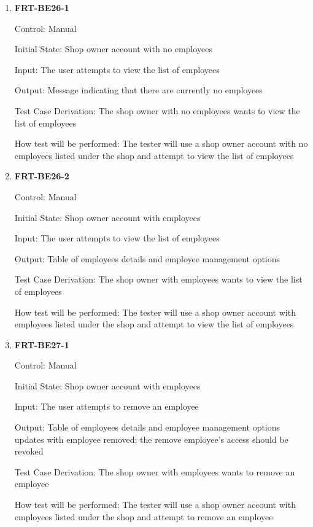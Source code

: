 \documentclass[12pt, titlepage]{article}
\begin{document}
\begin{enumerate}
	\item \textbf{FRT-BE26-1}

	      Control: Manual

	      Initial State: Shop owner account with no employees

	      Input: The user attempts to view the list of employees

	      Output: Message indicating that there are currently no employees

	      Test Case Derivation: The shop owner with no employees wants to view the list of employees

	      How test will be performed: The tester will use a shop owner account with no employees listed under
	      the shop and attempt to view the list of employees

	\item \textbf{FRT-BE26-2}

	      Control: Manual

	      Initial State: Shop owner account with employees

	      Input: The user attempts to view the list of employees

	      Output: Table of employees details and employee management options

	      Test Case Derivation: The shop owner with employees wants to view the list of employees

	      How test will be performed: The tester will use a shop owner account with employees listed under
	      the shop and attempt to view the list of employees

	\item \textbf{FRT-BE27-1}

	      Control: Manual

	      Initial State: Shop owner account with employees

	      Input: The user attempts to remove an employee

	      Output: Table of employees details and employee management options updates with employee removed;
	      the remove employee's access should be revoked

	      Test Case Derivation: The shop owner with employees wants to remove an employee

	      How test will be performed: The tester will use a shop owner account with employees listed under
	      the shop and attempt to remove an employee

\end{enumerate}
\end{document}
